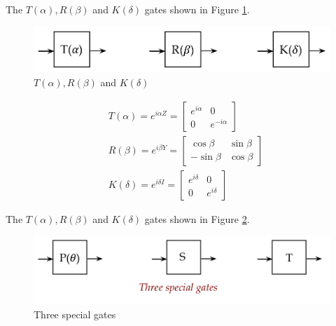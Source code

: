 \documentclass[main.tex]{subfiles}
\begin{document}
    The $T(\alpha), R(\beta)$ and $K(\delta)$ gates shown in Figure \ref{fig:12gate3}.
    
    \begin{figure}
        \centering
        \includegraphics[width=5in]{notes/figs/n08/12gate3.png}
        \caption{$T(\alpha), R(\beta)$ and $K(\delta)$}
        \label{fig:12gate3}
    \end{figure}
    
    $$
    \begin{aligned}
    &T(\alpha)=e^{i \alpha Z}=\left[\begin{array}{cc}
    e^{i \alpha} & 0 \\
    0 & e^{-i \alpha}
    \end{array}\right] \\
    &R(\beta)=e^{i \beta Y}=\left[\begin{array}{cc}
    \cos \beta & \sin \beta \\
    -\sin \beta & \cos \beta
    \end{array}\right] \\
    &K(\delta)=e^{i \delta I}=\left[\begin{array}{cc}
    e^{i \delta} & 0 \\
    0 & e^{i \delta}
    \end{array}\right]
    \end{aligned}
    $$
    
    The $T(\alpha), R(\beta)$ and $K(\delta)$ gates shown in Figure \ref{fig:13gate4}.
    
    \begin{figure}
        \centering
        \includegraphics[width=5in]{notes/figs/n08/13gate4.png}
        \caption{Three special gates}
        \label{fig:13gate4}
    \end{figure}
    
\end{document}
